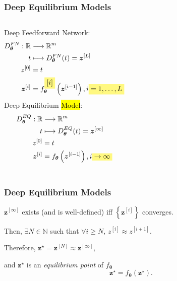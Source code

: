 \documentclass[t]{beamer}
\newcommand{\R}{\mathbb{R}}
\newcommand{\N}{\mathbb{N}}
\newcommand{\highlight}[1]{%
  \colorbox{yellow!50}{$\displaystyle#1$}}
\begin{document}
\begin{frame}
    \frametitle{Deep Equilibrium Models}
    \begin{columns}
	Deep Feedforward Network:
	\begin{align*}
	    D^{FN}_{\bm{\theta}}: \R &\longrightarrow \R^{m} \\
	    t &\longmapsto 	D^{FN}_{\bm{\theta}}(	t) = \bm{z}^{[L]} \\
	    z^{[0]} &= t \\
	    \bm{z}^{[i]} &= f^{\highlight{[i]}}_{\bm{\theta}}\left( \bm{z}^{[i-1]} \right) , i\highlight{=1,\ldots,L}
	\end{align*} \pause
	Deep Equilibrium \hl{Model}:
	\begin{align*}
	    D^{EQ}_{\bm{\theta}}: \R &\longrightarrow \R^{m} \\
	    t &\longmapsto 	D^{EQ}_{\bm{\theta}}(	t) = \bm{z}^{[\infty]} \\
	    z^{[0]} &= t \\
	    \bm{z}^{[i]} &= f_{\bm{\theta}}\left( \bm{z}^{[i-1]} \right) , i\highlight{\to \infty}
	\end{align*}
    \end{columns}
\end{frame}

\begin{frame}
    \frametitle{Deep Equilibrium Models}
    $\bm{z}^{[\infty]}$ exists (and is well-defined) iff $\left\{  \bm{z}^{[i]} \right\}$ converges.
    \linebreak \pause

    Then, $\exists N\in \N$ such that $\forall i\ge N,\,z^{[i]}\approx z^{[i+1]}$.
    \linebreak \pause

    Therefore, $\bm{z}^{\star}=\bm{z}^{[N]}\approx \bm{z}^{[\infty]}$,
    \linebreak \pause

    and $\bm{z}^{\star}$ is an \emph{equilibrium point} of $f_{\bm{\theta}}$ \[
	    \bm{z}^{\star} = f_{\bm{\theta}}\left( \bm{z}^{\star} \right)
    .\] 
\end{frame}
\end{document}
